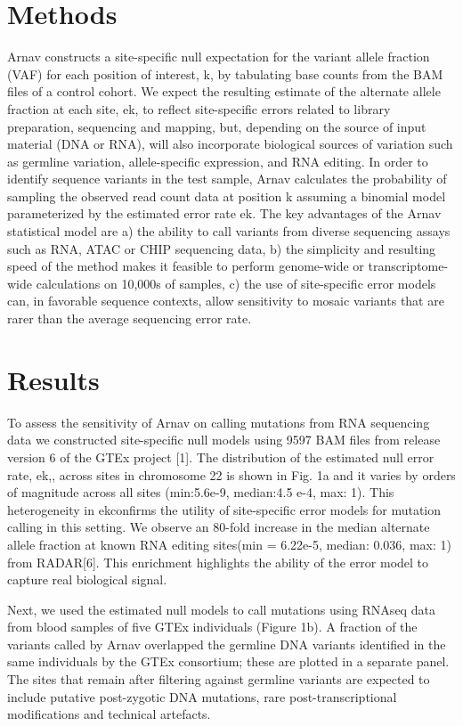 \section{Methods}

Arnav constructs a site-specific null expectation for the variant allele fraction (VAF) for each position of interest, k, by tabulating base counts from the BAM files of a control cohort. We expect the resulting estimate of the alternate allele fraction at each site, ek, to reflect site-specific errors related to library preparation, sequencing and mapping, but, depending on the source of input material (DNA or RNA), will also incorporate biological sources of variation such as germline variation, allele-specific expression, and RNA editing. In order to identify sequence variants in the test sample, Arnav calculates the probability of sampling the observed read count data at position k assuming a binomial model parameterized by the estimated error rate ek. The key advantages of the Arnav statistical model are a) the ability to call variants from diverse sequencing assays such as RNA, ATAC or CHIP sequencing data, b) the simplicity and resulting speed of the method makes it feasible to perform genome-wide or transcriptome-wide calculations on 10,000s of samples, c) the use of site-specific error models can, in favorable sequence contexts, allow sensitivity to mosaic variants that are rarer than the average sequencing error rate.


\section{Results}

To assess the sensitivity of Arnav on calling mutations from RNA sequencing data we constructed site-specific null models using 9597 BAM files from release version 6 of the GTEx project [1]. The distribution of the estimated null error rate, ek,, across sites in chromosome 22 is shown in Fig. 1a and it varies by orders of magnitude across all sites (min:5.6e-9, median:4.5 e-4, max: 1). This heterogeneity in ekconfirms the utility of site-specific error models for mutation calling in this setting. We observe an 80-fold increase in the median alternate allele fraction at known RNA editing sites(min = 6.22e-5, median: 0.036, max: 1) from RADAR[6]. This enrichment highlights the ability of the error model to capture real biological signal.

Next, we used the estimated null models to call mutations using RNAseq data from blood samples of five GTEx individuals (Figure 1b). A fraction of the variants called by Arnav overlapped the germline DNA variants identified in the same individuals by the GTEx consortium; these are plotted in a separate panel. The sites that remain after filtering against germline variants are expected to include putative post-zygotic DNA mutations, rare post-transcriptional modifications and technical artefacts.


